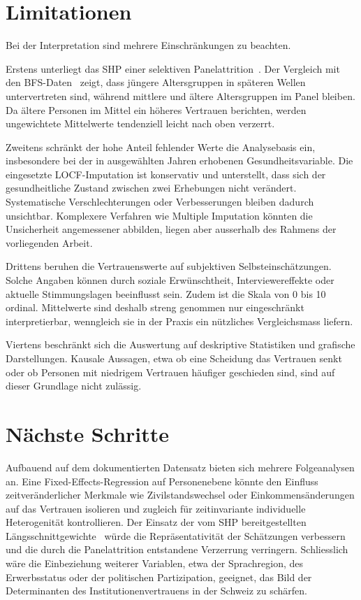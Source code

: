 
\section{Limitationen}
\label{sec:limitationen}

Bei der Interpretation sind mehrere Einschränkungen zu beachten.

Erstens unterliegt das SHP einer selektiven Panelattrition~\cite{Voorpostel2018}. Der Vergleich mit den
BFS-Daten~\cite{BFS2023} zeigt, dass jüngere Altersgruppen in späteren Wellen untervertreten sind,
während mittlere und ältere Altersgruppen im Panel bleiben. Da ältere Personen im
Mittel ein höheres Vertrauen berichten, werden ungewichtete Mittelwerte tendenziell
leicht nach oben verzerrt.

Zweitens schränkt der hohe Anteil fehlender Werte die Analysebasis ein, insbesondere
bei der in ausgewählten Jahren erhobenen Gesundheitsvariable. Die eingesetzte
LOCF-Imputation ist konservativ und unterstellt, dass sich der gesundheitliche Zustand
zwischen zwei Erhebungen nicht verändert. Systematische Verschlechterungen oder
Verbesserungen bleiben dadurch unsichtbar. Komplexere Verfahren wie Multiple
Imputation könnten die Unsicherheit angemessener abbilden, liegen aber ausserhalb des
Rahmens der vorliegenden Arbeit.

Drittens beruhen die Vertrauenswerte auf subjektiven Selbsteinschätzungen. Solche
Angaben können durch soziale Erwünschtheit, Interviewereffekte oder aktuelle
Stimmungslagen beeinflusst sein. Zudem ist die Skala von 0 bis 10 ordinal. Mittelwerte
sind deshalb streng genommen nur eingeschränkt interpretierbar, wenngleich sie in der
Praxis ein nützliches Vergleichsmass liefern.

Viertens beschränkt sich die Auswertung auf deskriptive Statistiken und grafische
Darstellungen. Kausale Aussagen, etwa ob eine Scheidung das Vertrauen senkt oder ob
Personen mit niedrigem Vertrauen häufiger geschieden sind, sind auf dieser Grundlage
nicht zulässig.



\section{Nächste Schritte}
\label{sec:naechsteschritte}

Aufbauend auf dem dokumentierten Datensatz bieten sich mehrere Folgeanalysen an. Eine
Fixed-Effects-Regression auf Personenebene könnte den Einfluss zeitveränderlicher
Merkmale wie Zivilstandswechsel oder Einkommensänderungen auf das Vertrauen isolieren
und zugleich für zeitinvariante individuelle Heterogenität kontrollieren. Der Einsatz
der vom SHP bereitgestellten Längsschnittgewichte~\cite{FORS2024} würde die Repräsentativität der
Schätzungen verbessern und die durch die Panelattrition entstandene Verzerrung
verringern. Schliesslich wäre die Einbeziehung weiterer Variablen, etwa der
Sprachregion, des Erwerbsstatus oder der politischen Partizipation, geeignet, das
Bild der Determinanten des Institutionenvertrauens in der Schweiz zu schärfen.
